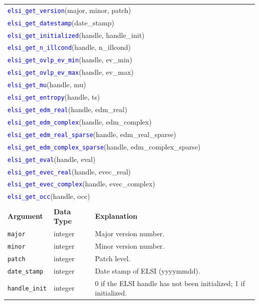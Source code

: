 \documentclass{report}
\newcommand{\api}[1]{\textcolor{blue}{\texttt{#1}}}
\begin{document}
\begin{longtable}[]{|p{35mm}|p{40mm}|p{87mm}|}
\multicolumn{3}{l}{\api{elsi\_get\_version}(major, minor, patch)}\\
\multicolumn{3}{l}{\api{elsi\_get\_datestamp}(date\_stamp)}\\
\multicolumn{3}{l}{\api{elsi\_get\_initialized}(handle, handle\_init)}\\
\multicolumn{3}{l}{\api{elsi\_get\_n\_illcond}(handle, n\_illcond)}\\
\multicolumn{3}{l}{\api{elsi\_get\_ovlp\_ev\_min}(handle, ev\_min)}\\
\multicolumn{3}{l}{\api{elsi\_get\_ovlp\_ev\_max}(handle, ev\_max)}\\
\multicolumn{3}{l}{\api{elsi\_get\_mu}(handle, mu)}\\
\multicolumn{3}{l}{\api{elsi\_get\_entropy}(handle, ts)}\\
\multicolumn{3}{l}{\api{elsi\_get\_edm\_real}(handle, edm\_real)}\\
\multicolumn{3}{l}{\api{elsi\_get\_edm\_complex}(handle, edm\_complex)}\\
\multicolumn{3}{l}{\api{elsi\_get\_edm\_real\_sparse}(handle, edm\_real\_sparse)}\\
\multicolumn{3}{l}{\api{elsi\_get\_edm\_complex\_sparse}(handle, edm\_complex\_sparse)}\\
\multicolumn{3}{l}{\api{elsi\_get\_eval}(handle, eval)}\\
\multicolumn{3}{l}{\api{elsi\_get\_evec\_real}(handle, evec\_real)}\\
\multicolumn{3}{l}{\api{elsi\_get\_evec\_complex}(handle, evec\_complex)}\\
\multicolumn{3}{l}{\api{elsi\_get\_occ}(handle, occ)}\\
\multicolumn{3}{l}{}\\
\hline
\multicolumn{1}{|l|}{\textbf{Argument}} & \multicolumn{1}{l|}{\textbf{Data Type}} & \multicolumn{1}{l|}{\textbf{Explanation}}\\
\hline
\texttt{major}                & integer                 & Major version number.\\
\hline
\texttt{minor}                & integer                 & Minor version number.\\
\hline
\texttt{patch}                & integer                 & Patch level.\\
\hline
\texttt{date\_stamp}          & integer                 & Date stamp of ELSI (yyyymmdd).\\
\hline
\texttt{handle\_init}         & integer                 & 0 if the ELSI handle has not been initialized; 1 if initialized.\\

\end{longtable}
\end{document}
